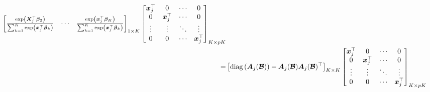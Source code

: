 \documentclass[11pt]{article}
\newcommand{\bX}{\bm{X}}
\newcommand{\bbeta}{\bm{\beta}}
\begin{document}
$$\begin{aligned}
\begin{bmatrix}
\frac{\exp\left(\bX_j^\top\bbeta_2\right)}{\sum_{k=1}^K\exp\left(\bm{x}_j^\top\bbeta_k\right)} &
\cdots &
\frac{\exp\left(\bm{x}_j^\top\bbeta_K\right)}{\sum_{k=1}^K\exp\left(\bm{x}_j^\top\bbeta_k\right)}
\end{bmatrix}_{1\times K}
\begin{bmatrix}
\bm{x}_j^\top & 0 & \cdots & 0 \\
0 & \bm{x}_j^\top & \cdots & 0 \\
\vdots & \vdots & \ddots & \vdots \\
0 & 0 & \cdots & \bm{x}_j^\top \\
\end{bmatrix}_{K\times pK} \\
=&\left[{\rm diag}\left(\bm{A}_j(\bm{\mathcal{B}})\right)-\bm{A}_j(\bm{\mathcal{B}})\bm{A}_j(\bm{\mathcal{B}})^\top\right]_{K\times K}
\begin{bmatrix}
\bm{x}_j^\top & 0 & \cdots & 0 \\
0 & \bm{x}_j^\top & \cdots & 0 \\
\vdots & \vdots & \ddots & \vdots \\
0 & 0 & \cdots & \bm{x}_j^\top \\
\end{bmatrix}_{K\times pK} \\
\end{aligned}$$
\end{document}
